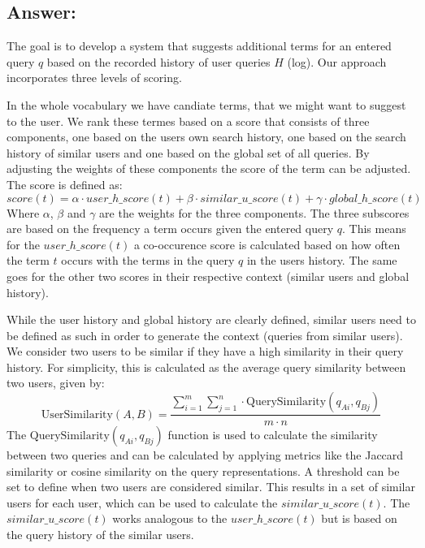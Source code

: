 \subsection*{Answer:}

The goal is to develop a system that suggests additional terms for an entered query $q$ based on the recorded history of user queries $H$ (log). Our approach incorporates three levels of scoring. 

In the whole vocabulary we have candiate terms, that we might want to suggest to the user. We rank these termes based on a score that consists of three components, one based on the users own search history, one based on the search history of similar users and one based on the global set of all queries. By adjusting the weights of these components the score of the term can be adjusted.
The score is defined as: 
$$score(t) = \alpha \cdot user\_h\_score(t) + \beta \cdot similar\_u\_score(t) + \gamma \cdot global\_h\_score(t)$$ Where $\alpha$, $\beta$ and $\gamma$ are the weights for the three components. 
The three subscores are based on the frequency a term occurs given the entered query $q$. This means for the $user\_h\_score(t)$ a co-occurence score is calculated based on how often the term $t$ occurs with the terms in the query $q$ in the users history. The same goes for the other two scores in their respective context (similar users and global history).

While the user history and global history are clearly defined, similar users need to be defined as such in order to generate the context (queries from similar users).
We consider two users to be similar if they have a high similarity in their query history. For simplicity, this is calculated as the average query similarity between two users, given by: $$\text{UserSimilarity}(A, B) = \frac{\sum_{i=1}^m \sum_{j=1}^n \cdot \text{QuerySimilarity}(q_{Ai}, q_{Bj})}{ m \cdot n}$$
The $\text{QuerySimilarity}(q_{Ai}, q_{Bj})$ function is used to calculate the similarity between two queries and can be calculated by applying metrics like the Jaccard similarity or cosine similarity on the query representations.
A threshold can be set to define when two users are considered similar. This results in a set of similar users for each user, which can be used to calculate the $similar\_u\_score(t)$. The $similar\_u\_score(t)$ works analogous to the $user\_h\_score(t)$ but is based on the query history of the similar users.

